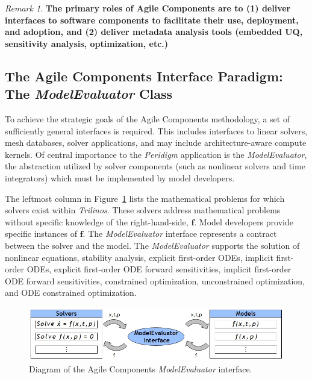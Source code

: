 \documentclass[pdf,ps2pdf,12pt,report]{SANDreport}
\theoremstyle{plain}
\theoremstyle{definition}
\theoremstyle{remark}
\newtheorem{rem}{Remark}[section]
\numberwithin{equation}{section}
\begin{document}
\begin{rem}
\textbf{The primary roles of Agile Components are to (1) deliver interfaces to software components to facilitate their use, deployment, and adoption, and (2) deliver metadata analysis tools (embedded UQ, sensitivity analysis, optimization, etc.)}
\end{rem}

\subsection{The Agile Components Interface Paradigm: The \emph{ModelEvaluator} Class}

To achieve the strategic goals of the Agile Components methodology, a set of sufficiently general interfaces is required. This includes interfaces to linear solvers, mesh databases, solver applications, and may include architecture-aware compute kernels. Of central importance to the \emph{Peridigm} application is the \emph{ModelEvaluator}, the abstraction utilized by solver components (such as nonlinear solvers and time integrators) which must be implemented by model developers.

The leftmost column in Figure~\ref{fig:ACModelEvaluator} lists the mathematical problems for which solvers exist within \emph{Trilinos}. These solvers address mathematical problems without specific knowledge of the right-hand-side, $\mathbf{f}$. Model developers provide specific instances of $\mathbf{f}$. The \emph{ModelEvaluator} interface represents a contract between the solver and the model. The \emph{ModelEvaluator} supports the solution of nonlinear equations, stability analysis, explicit first-order ODEs, implicit first-order ODEs, explicit first-order ODE forward sensitivities, implicit first-order ODE forward sensitivities, constrained optimization, unconstrained optimization, and ODE constrained optimization.

\begin{figure}[h!]
\begin{center}
	\includegraphics[width=\linewidth]{ModelEvaluatorInterface}
 \end{center}
 \caption{Diagram of the Agile Components \emph{ModelEvaluator} interface.}
\label{fig:ACModelEvaluator}
\end{figure}
\end{document}
